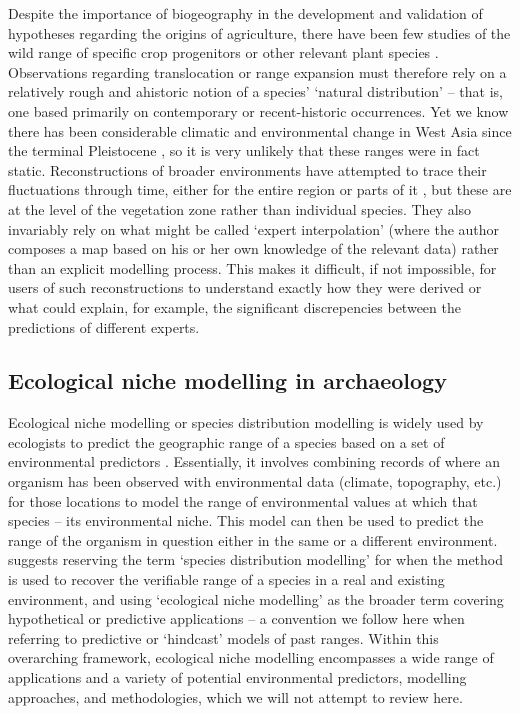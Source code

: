 \documentclass[
  authoryear,
  preprint]{elsarticle}
\begin{document}
Despite the importance of biogeography in the development and validation
of hypotheses regarding the origins of agriculture, there have been few
studies of the wild range of specific crop progenitors or other relevant
plant species \citep[cf.~for domestic animals, e.g.][]{YeomansEtAl2017}.
Observations regarding translocation or range expansion must therefore
rely on a relatively rough and ahistoric notion of a species' `natural
distribution' -- that is, one based primarily on contemporary or
recent-historic occurrences. Yet we know there has been considerable
climatic and environmental change in West Asia since the terminal
Pleistocene \citep{JonesEtAl2019}, so it is very unlikely that these
ranges were in fact static. Reconstructions of broader environments have
attempted to trace their fluctuations through time, either for the
entire region
\citetext{\citealp[e.g.][]{VanZeistBottema1991}; \citealp[Hillman
in][]{MooreEtAl2000}} or parts of it \citep[e.g.][]{Cordova2007}, but
these are at the level of the vegetation zone rather than individual
species. They also invariably rely on what might be called `expert
interpolation' (where the author composes a map based on his or her own
knowledge of the relevant data) rather than an explicit modelling
process. This makes it difficult, if not impossible, for users of such
reconstructions to understand exactly how they were derived or what
could explain, for example, the significant discrepencies between the
predictions of different experts.

\subsection{Ecological niche modelling in
archaeology}\label{ecological-niche-modelling-in-archaeology}

Ecological niche modelling or species distribution modelling is widely
used by ecologists to predict the geographic range of a species based on
a set of environmental predictors \citep{FranklinMiller2009}.
Essentially, it involves combining records of where an organism has been
observed with environmental data (climate, topography, etc.) for those
locations to model the range of environmental values at which that
species -- its environmental niche. This model can then be used to
predict the range of the organism in question either in the same or a
different environment. \citet{TownsendPetersonSoberon2012} suggests
reserving the term `species distribution modelling' for when the method
is used to recover the verifiable range of a species in a real and
existing environment, and using `ecological niche modelling' as the
broader term covering hypothetical or predictive applications -- a
convention we follow here when referring to predictive or `hindcast'
models of past ranges. Within this overarching framework, ecological
niche modelling encompasses a wide range of applications and a variety
of potential environmental predictors, modelling approaches, and
methodologies, which we will not attempt to review here.
\end{document}
